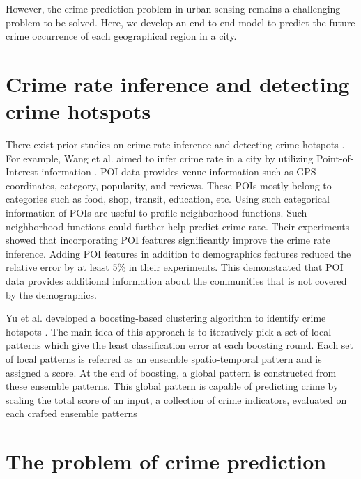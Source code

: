 \noindent However, the crime prediction problem in urban sensing remains a challenging 
problem to be solved. Here, we develop an end-to-end model to predict the future crime 
occurrence of each geographical region in a city.

\section{Crime rate inference and detecting crime hotspots}
There exist prior studies on crime rate inference and detecting crime 
hotspots \cite{p7,p2}. 
For example, Wang et al. aimed to
infer crime rate in a city by utilizing Point-of-Interest 
information \cite{p7}. 
POI data provides venue information such as GPS coordinates, category, 
popularity, and reviews. 
These POIs mostly belong to categories such as food, shop, transit, education, etc. 
Using such categorical information of POIs are useful to profile neighborhood 
functions. Such 
neighborhood functions could further help predict crime rate. Their experiments 
showed that 
incorporating POI features significantly improve the crime rate inference. Adding
POI features in addition to demographics features reduced the relative error 
by at least 5\% in 
their experiments. This demonstrated that POI data provides additional 
information about the communities that is not covered by the demographics.

\noindent Yu et al. developed a boosting-based clustering algorithm
to identify crime hotspots \cite{p2}. The main idea of this approach is
to iteratively pick a set of local patterns which give the least classification error
at each boosting round. Each set of local patterns is referred as an ensemble
spatio-temporal pattern and is assigned a score. At the end of boosting, a global 
pattern is constructed from these ensemble patterns. This global pattern is capable 
of predicting crime by scaling the total score of an input, a collection of crime 
indicators, evaluated on each crafted ensemble patterns 

\section{The problem of crime prediction}

